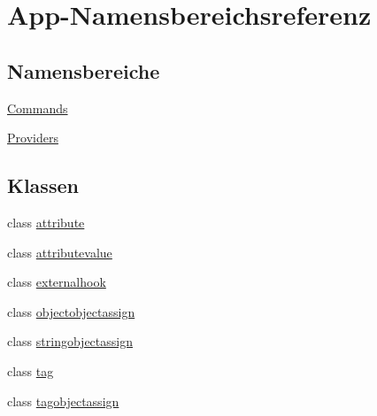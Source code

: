 \hypertarget{namespaceApp}{}\section{App-\/\+Namensbereichsreferenz}
\label{namespaceApp}
\subsection*{Namensbereiche}
\begin{DoxyCompactItemize}
\item 
 \hyperlink{namespaceApp_1_1Commands}{Commands}
\item 
 \hyperlink{namespaceApp_1_1Providers}{Providers}
\end{DoxyCompactItemize}
\subsection*{Klassen}
\begin{DoxyCompactItemize}
\item 
class \hyperlink{classApp_1_1attribute}{attribute}
\item 
class \hyperlink{classApp_1_1attributevalue}{attributevalue}
\item 
class \hyperlink{classApp_1_1externalhook}{externalhook}
\item 
class \hyperlink{classApp_1_1objectobjectassign}{objectobjectassign}
\item 
class \hyperlink{classApp_1_1stringobjectassign}{stringobjectassign}
\item 
class \hyperlink{classApp_1_1tag}{tag}
\item 
class \hyperlink{classApp_1_1tagobjectassign}{tagobjectassign}
\end{DoxyCompactItemize}
